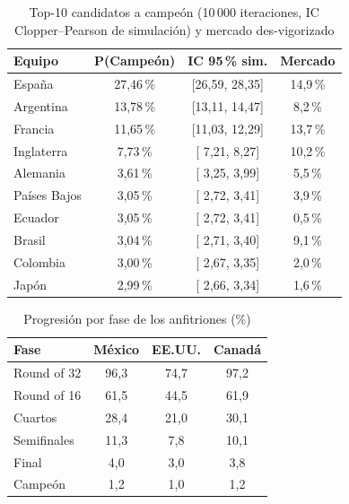 \documentclass[conference]{IEEEtran}
\begin{document}
\begin{table}[!t]
  \caption{Top-10 candidatos a campe\'on (10\,000 iteraciones, IC
    Clopper--Pearson de simulaci\'on) y mercado des-vigorizado}
  \label{tab:top10}
  \centering
  \renewcommand{\arraystretch}{1.15}
  \small
  \begin{tabular}{@{}lccc@{}}
    \toprule
    \textbf{Equipo} & \textbf{P(Campe\'on)} & \textbf{IC 95\,\% sim.} & \textbf{Mercado} \\
    \midrule
    Espa\~na        & 27{,}46\,\%           & [26{,}59, 28{,}35] & 14{,}9\,\% \\
    Argentina       & 13{,}78\,\%           & [13{,}11, 14{,}47] &  8{,}2\,\% \\
    Francia         & 11{,}65\,\%           & [11{,}03, 12{,}29] & 13{,}7\,\% \\
    Inglaterra      &  7{,}73\,\%           & [ 7{,}21,  8{,}27] & 10{,}2\,\% \\
    Alemania        &  3{,}61\,\%           & [ 3{,}25,  3{,}99] &  5{,}5\,\% \\
    Pa\'ises Bajos  &  3{,}05\,\%           & [ 2{,}72,  3{,}41] &  3{,}9\,\% \\
    Ecuador         &  3{,}05\,\%           & [ 2{,}72,  3{,}41] &  0{,}5\,\% \\
    Brasil          &  3{,}04\,\%           & [ 2{,}71,  3{,}40] &  9{,}1\,\% \\
    Colombia        &  3{,}00\,\%           & [ 2{,}67,  3{,}35] &  2{,}0\,\% \\
    Jap\'on         &  2{,}99\,\%           & [ 2{,}66,  3{,}34] &  1{,}6\,\% \\
    \bottomrule
  \end{tabular}
\end{table}

\begin{table}[!t]
  \caption{Progresi\'on por fase de los anfitriones (\%)}
  \label{tab:hosts}
  \centering
  \renewcommand{\arraystretch}{1.15}
  \begin{tabular}{@{}lccc@{}}
    \toprule
    \textbf{Fase} & \textbf{M\'exico} & \textbf{EE.UU.} & \textbf{Canad\'a} \\
    \midrule
    Round of 32   & 96{,}3            & 74{,}7          & 97{,}2            \\
    Round of 16   & 61{,}5            & 44{,}5          & 61{,}9            \\
    Cuartos       & 28{,}4            & 21{,}0          & 30{,}1            \\
    Semifinales   & 11{,}3            & 7{,}8           & 10{,}1            \\
    Final         & 4{,}0             & 3{,}0           & 3{,}8             \\
    Campe\'on     & 1{,}2             & 1{,}0           & 1{,}2             \\
    \bottomrule
  \end{tabular}
\end{table}
\end{document}
